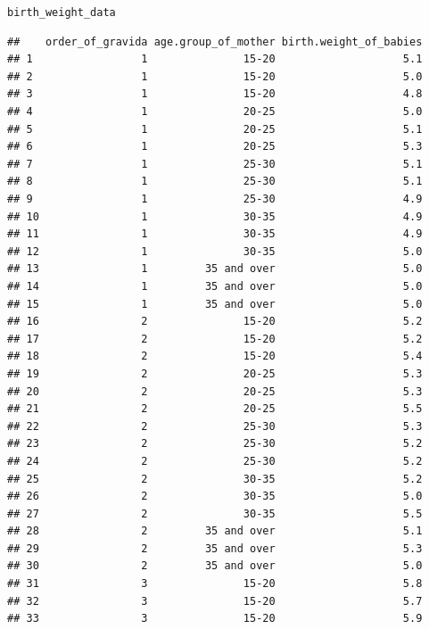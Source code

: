 \documentclass[11pt, a4paper]{article}\usepackage[]{graphicx}\usepackage[]{xcolor}
\makeatletter
\newcommand{\hlstd}[1]{\textcolor[rgb]{0.345,0.345,0.345}{#1}}%
\newenvironment{kframe}{%
 \def\at@end@of@kframe{}%
 \ifinner\ifhmode%
  \def\at@end@of@kframe{\end{minipage}}%
  \begin{minipage}{\columnwidth}%
 \fi\fi%
 \def\FrameCommand##1{\hskip\@totalleftmargin \hskip-\fboxsep
 \colorbox{shadecolor}{##1}\hskip-\fboxsep
     \hskip-\linewidth \hskip-\@totalleftmargin \hskip\columnwidth}%
 \MakeFramed {\advance\hsize-\width
   \@totalleftmargin\z@ \linewidth\hsize
   \@setminipage}}%
 {\par\unskip\endMakeFramed%
 \at@end@of@kframe}
\newenvironment{knitrout}{}{} %
\makeatother
\begin{document}
\begin{knitrout}
\color{fgcolor}\begin{kframe}
\begin{alltt}
\hlstd{birth_weight_data}
\end{alltt}
\begin{verbatim}
##    order_of_gravida age.group_of_mother birth.weight_of_babies
## 1                 1               15-20                    5.1
## 2                 1               15-20                    5.0
## 3                 1               15-20                    4.8
## 4                 1               20-25                    5.0
## 5                 1               20-25                    5.1
## 6                 1               20-25                    5.3
## 7                 1               25-30                    5.1
## 8                 1               25-30                    5.1
## 9                 1               25-30                    4.9
## 10                1               30-35                    4.9
## 11                1               30-35                    4.9
## 12                1               30-35                    5.0
## 13                1         35 and over                    5.0
## 14                1         35 and over                    5.0
## 15                1         35 and over                    5.0
## 16                2               15-20                    5.2
## 17                2               15-20                    5.2
## 18                2               15-20                    5.4
## 19                2               20-25                    5.3
## 20                2               20-25                    5.3
## 21                2               20-25                    5.5
## 22                2               25-30                    5.3
## 23                2               25-30                    5.2
## 24                2               25-30                    5.2
## 25                2               30-35                    5.2
## 26                2               30-35                    5.0
## 27                2               30-35                    5.5
## 28                2         35 and over                    5.1
## 29                2         35 and over                    5.3
## 30                2         35 and over                    5.0
## 31                3               15-20                    5.8
## 32                3               15-20                    5.7
## 33                3               15-20                    5.9

\end{verbatim}
\end{kframe}
\end{knitrout}
\end{document}
